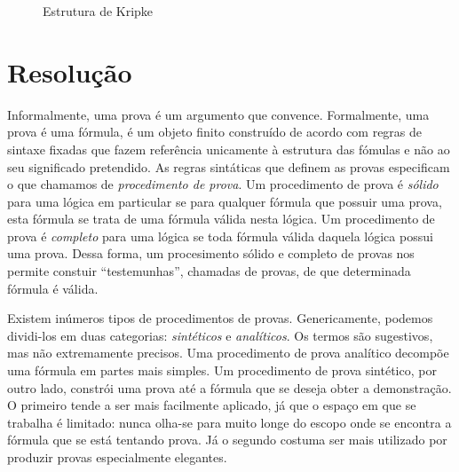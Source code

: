 \begin{figure}
\label{fig:kripke}
    \begin{center}
    \end{center}
    \caption{Estrutura de Kripke}
\end{figure}


\section{Resolução}
\label{sec:resolucao}
Informalmente, uma prova é um argumento que convence. Formalmente, uma prova é
uma fórmula, é um objeto finito construído de acordo com regras de sintaxe
fixadas que fazem referência unicamente à estrutura das fómulas e não ao seu
significado pretendido. As regras sintáticas que definem as provas especificam o
que chamamos de \textit{procedimento de prova}.
Um procedimento de prova é \textit{sólido} para uma lógica em particular se
para qualquer fórmula que possuir uma prova, esta fórmula se trata de uma
fórmula válida nesta lógica. Um procedimento de prova é \textit{completo} para
uma lógica se toda fórmula válida daquela lógica possui uma prova. Dessa forma,
um procesimento sólido e completo de provas nos permite constuir
``testemunhas'', chamadas de provas, de que determinada fórmula é válida.

Existem inúmeros tipos de procedimentos de provas. Genericamente, podemos
dividi-los em duas categorias: \textit{sintéticos} e \textit{analíticos}. Os
termos são sugestivos, mas não extremamente precisos. Uma procedimento de prova
analítico decompõe uma fórmula em partes mais simples. Um procedimento de prova
sintético, por outro lado, constrói uma prova até a fórmula que se deseja obter a
demonstração.
O primeiro tende a ser mais facilmente aplicado, já que o espaço em que se
trabalha é limitado: nunca olha-se para muito longe do escopo onde se encontra a
fórmula que se está tentando prova. Já o segundo costuma ser mais utilizado por
produzir provas especialmente elegantes.

